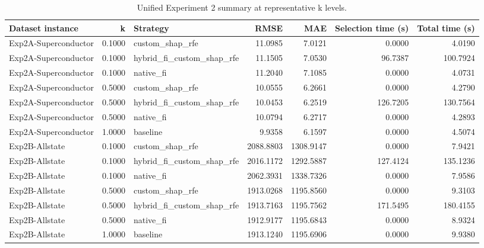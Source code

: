 \begin{table}
\caption{Unified Experiment 2 summary at representative k levels.}
\label{tab:exp2_unified_k}
\begin{tabular}{lrlrrrr}
\toprule
Dataset instance & k & Strategy & RMSE & MAE & Selection time (s) & Total time (s) \\
\midrule
Exp2A-Superconductor & 0.1000 & custom\_shap\_rfe & 11.0985 & 7.0121 & 0.0000 & 4.0190 \\
Exp2A-Superconductor & 0.1000 & hybrid\_fi\_custom\_shap\_rfe & 11.1505 & 7.0530 & 96.7387 & 100.7924 \\
Exp2A-Superconductor & 0.1000 & native\_fi & 11.2040 & 7.1085 & 0.0000 & 4.0731 \\
Exp2A-Superconductor & 0.5000 & custom\_shap\_rfe & 10.0555 & 6.2661 & 0.0000 & 4.2790 \\
Exp2A-Superconductor & 0.5000 & hybrid\_fi\_custom\_shap\_rfe & 10.0453 & 6.2519 & 126.7205 & 130.7564 \\
Exp2A-Superconductor & 0.5000 & native\_fi & 10.0794 & 6.2717 & 0.0000 & 4.2893 \\
Exp2A-Superconductor & 1.0000 & baseline & 9.9358 & 6.1597 & 0.0000 & 4.5074 \\
Exp2B-Allstate & 0.1000 & custom\_shap\_rfe & 2088.8803 & 1308.9147 & 0.0000 & 7.9421 \\
Exp2B-Allstate & 0.1000 & hybrid\_fi\_custom\_shap\_rfe & 2016.1172 & 1292.5887 & 127.4124 & 135.1236 \\
Exp2B-Allstate & 0.1000 & native\_fi & 2062.3931 & 1338.7326 & 0.0000 & 7.9586 \\
Exp2B-Allstate & 0.5000 & custom\_shap\_rfe & 1913.0268 & 1195.8560 & 0.0000 & 9.3103 \\
Exp2B-Allstate & 0.5000 & hybrid\_fi\_custom\_shap\_rfe & 1913.7163 & 1195.7562 & 171.5495 & 180.4155 \\
Exp2B-Allstate & 0.5000 & native\_fi & 1912.9177 & 1195.6843 & 0.0000 & 8.9324 \\
Exp2B-Allstate & 1.0000 & baseline & 1913.1240 & 1195.6906 & 0.0000 & 9.9380 \\
\bottomrule
\end{tabular}
\end{table}
